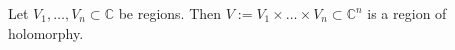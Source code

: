Let $V_1, \ldots, V_n \subset \mathbb{C}$ be regions. Then $V := V_1 \times \ldots \times V_n \subset \mathbb{C}^n$ is a region of holomorphy.
